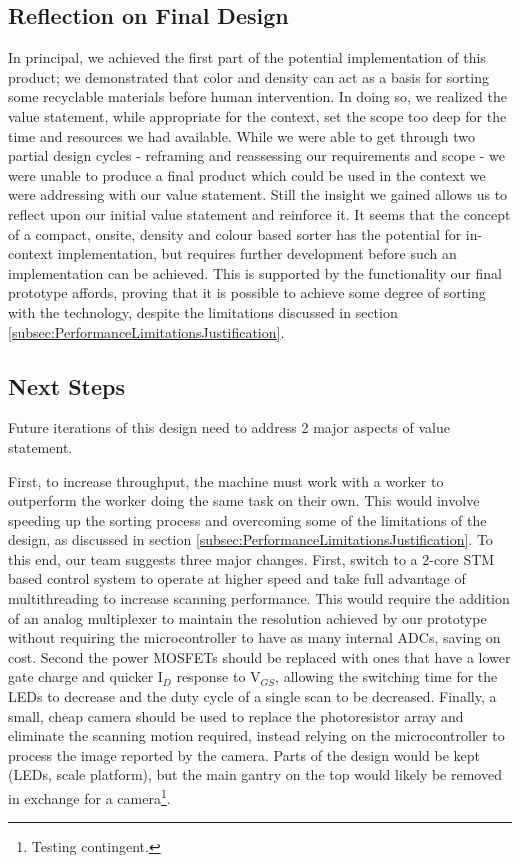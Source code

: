 \documentclass[12pt]{article}
\begin{document}
\begin{multicols*}{2}
        \subsection{Reflection on Final Design}
            In principal, we achieved the first part of the potential implementation of this product; we demonstrated that color and density can act as a basis for sorting some recyclable materials before human intervention. In doing so, we realized the value statement, while appropriate for the context, set the scope too deep for the time and resources we had available. While we were able to get through two partial design cycles - reframing and reassessing our requirements and scope - we were unable to produce a final product which could be used in the context we were addressing with our value statement. Still the insight we gained allows us to reflect upon our initial value statement and reinforce it. It seems that the concept of a compact, onsite, density and colour based sorter has the potential for in-context implementation, but requires further development before such an implementation can be achieved. This is supported by the functionality our final prototype affords, proving that it is possible to achieve some degree of sorting with the technology, despite the limitations discussed in section \ref{subsec:PerformanceLimitationsJustification}.

        \subsection{Next Steps} \label{subsec:NextSteps}
            Future iterations of this design need to address 2 major aspects of value statement.
            
            First, to increase throughput, the machine must work with a worker to outperform the worker doing the same task on their own. This would involve speeding up the sorting process and overcoming some of the limitations of the design, as discussed in section \ref{subsec:PerformanceLimitationsJustification}. To this end, our team suggests three major changes. First, switch to a 2-core STM based control system to operate at higher speed and take full advantage of multithreading to increase scanning performance. This would require the addition of an analog multiplexer to maintain the resolution achieved by our prototype without requiring the microcontroller to have as many internal ADCs, saving on cost. Second the power MOSFETs should be replaced with ones that have a lower gate charge and quicker I$_D$ response to V$_{GS}$, allowing the switching time for the LEDs to decrease and the duty cycle of a single scan to be decreased. Finally, a small, cheap camera should be used to replace the photoresistor array and eliminate the scanning motion required, instead relying on the microcontroller to process the image reported by the camera. Parts of the design would be kept (LEDs, scale platform), but the main gantry on the top would likely be removed in exchange for a camera\footnote{Testing contingent.}.
            

\end{multicols*}
\end{document}
